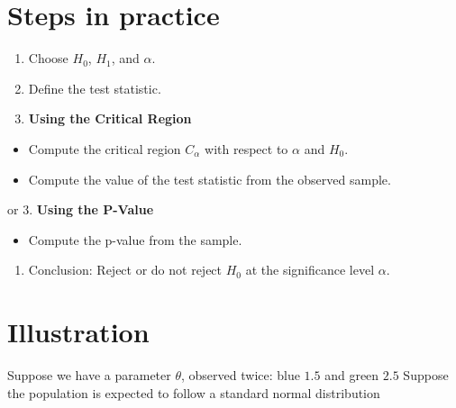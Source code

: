 \documentclass[
  letterpaper,
  DIV=11,
  numbers=noendperiod]{scrreprt}
\providecommand{\tightlist}{%
  \setlength{\itemsep}{0pt}\setlength{\parskip}{0pt}}\usepackage{longtable,booktabs,array}
\begin{document}
\section{Steps in practice}\label{steps-in-practice}

\begin{enumerate}
\def\labelenumi{\arabic{enumi}.}
\item
  Choose \(H_0\), \(H_1\), and \(\alpha\).
\item
  Define the test statistic.
\item
  \textbf{Using the Critical Region}
\end{enumerate}

\begin{itemize}
\tightlist
\item
  Compute the critical region \(C_\alpha\) with respect to \(\alpha\)
  and \(H_0\).
\item
  Compute the value of the test statistic from the observed sample.
\end{itemize}

or 3. \textbf{Using the P-Value}

\begin{itemize}
\tightlist
\item
  Compute the p-value from the sample.
\end{itemize}

\begin{enumerate}
\def\labelenumi{\arabic{enumi}.}
\setcounter{enumi}{3}
\tightlist
\item
  Conclusion: Reject or do not reject \(H_0\) at the significance level
  \(\alpha\).
\end{enumerate}

\section{Illustration}\label{illustration}

Suppose we have a parameter \(\theta\), observed twice: blue \(1.5\) and
green \(2.5\) Suppose the population is expected to follow a standard
normal distribution
\end{document}
